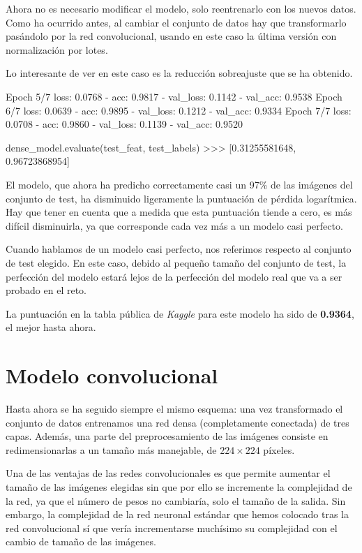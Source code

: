 Ahora no es necesario modificar el modelo, solo reentrenarlo con los nuevos datos. Como ha ocurrido antes, al cambiar el conjunto de datos hay que transformarlo pasándolo por la red convolucional, usando en este caso la última versión con normalización por lotes.

Lo interesante de ver en este caso es la reducción sobreajuste que se ha obtenido.

\begin{python}
Epoch 5/7
loss: 0.0768 - acc: 0.9817 - val_loss: 0.1142 - val_acc: 0.9538
Epoch 6/7
loss: 0.0639 - acc: 0.9895 - val_loss: 0.1212 - val_acc: 0.9334
Epoch 7/7
loss: 0.0708 - acc: 0.9860 - val_loss: 0.1139 - val_acc: 0.9520

dense_model.evaluate(test_feat, test_labels)
>>> [0.31255581648, 0.96723868954]
\end{python}

El modelo, que ahora ha predicho correctamente casi un 97\% de las imágenes del conjunto de test, ha disminuido ligeramente la puntuación de pérdida logarítmica. Hay que tener en cuenta que a medida que esta puntuación tiende a cero, es más difícil disminuirla, ya que corresponde cada vez más a un modelo casi perfecto.

Cuando hablamos de un modelo casi perfecto, nos referimos respecto al conjunto de test elegido. En este caso, debido al pequeño tamaño del conjunto de test, la perfección del modelo estará lejos de la perfección del modelo real que va a ser probado en el reto.

La puntuación en la tabla pública de \textit{Kaggle} para este modelo ha sido
de \textbf{0.9364}, el mejor hasta ahora.

\section{Modelo convolucional}

Hasta ahora se ha seguido siempre el mismo esquema: una vez transformado el conjunto de datos entrenamos una red densa (completamente conectada) de tres capas. Además, una parte del preprocesamiento de las imágenes consiste en redimensionarlas a un tamaño más manejable, de $224\times224$ píxeles.

Una de las ventajas de las redes convolucionales es que permite aumentar el tamaño de las imágenes elegidas sin que por ello se incremente la complejidad de la red, ya que el número de pesos no cambiaría, solo el tamaño de la salida. Sin embargo, la complejidad de la red neuronal estándar que hemos colocado tras la red convolucional sí que vería incrementarse muchísimo su complejidad con el cambio de tamaño de las imágenes.

